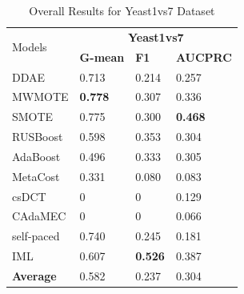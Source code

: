 \begin{table}[H]
    \centering
    \renewcommand\arraystretch{0.85}
    \begin{tabular}{|p{}<{\centering}|p{}<{\centering}|p{}<{\centering}|p{}<{\centering}|}
    \hline
    \multirow{2}{*}{Models} & \multicolumn{3}{c|}{\textbf{Yeast1vs7}}    \\ \cline{2-4} 
                             & \textbf{G-mean} & \textbf{F1} & \textbf{AUCPRC} \\ \hline
    DDAE                     & 0.713	&0.214	&0.257               \\ \hline
    MWMOTE                   &\textbf{0.778}	&0.307	&0.336             \\ \hline
    SMOTE                    &0.775	&0.300	&\textbf{0.468}               \\ \hline
    RUSBoost                 &0.598	& 0.353	&0.304            \\ \hline
    AdaBoost                 & 0.496	&0.333	&0.305              \\ \hline
    MetaCost                 & 0.331	&0.080	&0.083             \\ \hline
    csDCT                    &0	&0	&0.129              \\ \hline
    CAdaMEC                  &0	&0	&0.066              \\ \hline
    self-paced               & 0.740	&0.245	&0.181               \\ \hline
    IML                      & 0.607	&\textbf{0.526}	&0.387             \\ \hline\hline
    \textbf{Average}         & 0.582	&0.237	&0.304               \\ \hline
    \end{tabular}
    \vspace{-8pt}
    \caption{Overall Results for Yeast1vs7 Dataset}
    \label{tab16}
\end{table}
